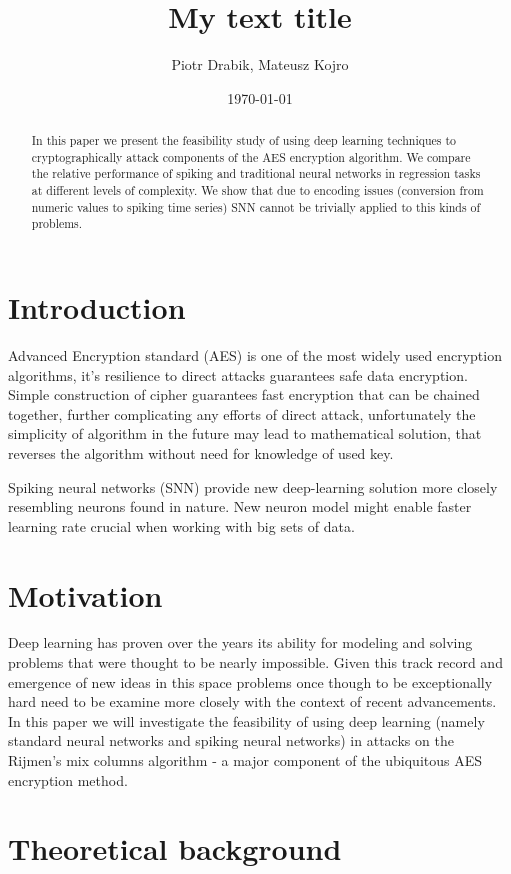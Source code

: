 \documentclass{article}
\title{My text title}
\author{Piotr Drabik, Mateusz Kojro}
\date{\today}
\begin{document}
\maketitle

\begin{abstract}
In this paper we present the feasibility study of using deep learning techniques to cryptographically attack components of the AES encryption algorithm. We compare the relative performance of spiking and traditional neural networks in regression tasks at different levels of complexity. We show that due to encoding issues (conversion from numeric values to spiking time series) SNN cannot be trivially applied to this kinds of problems.
\end{abstract}


\section{Introduction}
Advanced Encryption standard (AES) is one of the most widely used encryption algorithms, it's resilience to direct attacks guarantees safe data encryption. Simple construction of cipher guarantees fast encryption that can be chained together, further complicating any efforts of direct attack, unfortunately the simplicity of algorithm in the future may lead to mathematical solution, that reverses the algorithm without need for knowledge of used key.

Spiking neural networks (SNN) provide new deep-learning solution more closely resembling neurons found in nature. New neuron model might enable faster learning rate crucial when working with big sets of data.

\section{Motivation}

Deep learning has proven over the years its ability for modeling and solving problems that were thought to be nearly impossible. Given this track record and emergence of new ideas in this space problems once though to be exceptionally hard need to be examine more closely with the context of recent advancements. In this paper we will investigate the feasibility of using deep learning (namely standard neural networks and spiking neural networks) in attacks on the Rijmen's mix columns algorithm - a major component of the ubiquitous AES encryption method.

\section{Theoretical background}
\end{document}
